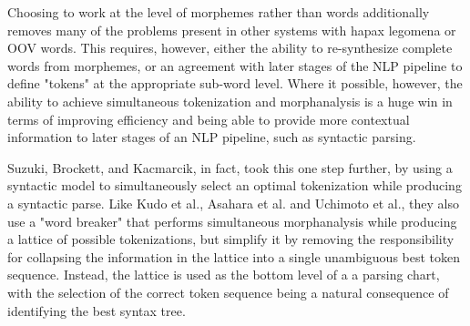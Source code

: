 Choosing to work at the level of morphemes rather than words additionally removes many of the problems present in other systems with hapax legomena or OOV words. This requires, however, either the ability to re-synthesize complete words from morphemes, or an agreement with later stages of the NLP pipeline to define "tokens" at the appropriate sub-word level. Where it possible, however, the ability to achieve simultaneous tokenization and morphanalysis is a huge win in terms of improving efficiency and being able to provide more contextual information to later stages of an NLP pipeline, such as syntactic parsing.

Suzuki, Brockett, and Kacmarcik\cite{suzuki00}, in fact, took this one step further, by using a syntactic model to simultaneously select an optimal tokenization while producing a syntactic parse. Like Kudo et al.\cite{kudo04}, Asahara et al.\cite{asahara00} and Uchimoto et al.\cite{uchimoto01}, they also use a "word breaker" that performs simultaneous morphanalysis while producing a lattice of possible tokenizations, but simplify it by removing the responsibility for collapsing the information in the lattice into a single unambiguous best token sequence. Instead, the lattice is used as the bottom level of a a parsing chart, with the selection of the correct token sequence being a natural consequence of identifying the best syntax tree.


